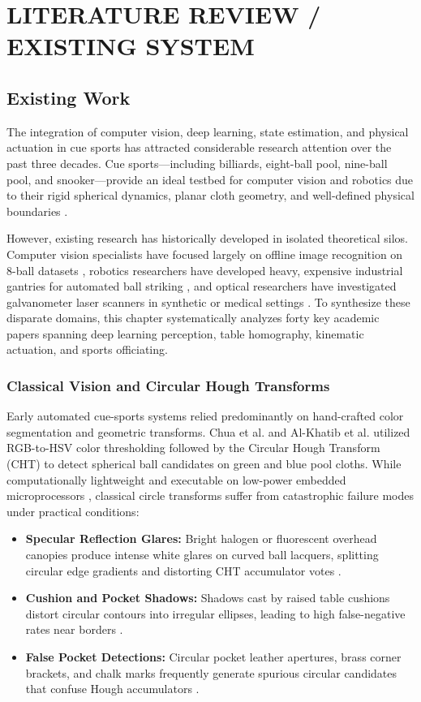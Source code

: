 \chapter{LITERATURE REVIEW / EXISTING SYSTEM}

\section{Existing Work}
The integration of computer vision, deep learning, state estimation, and physical actuation in cue sports has attracted considerable research attention over the past three decades. Cue sports---including billiards, eight-ball pool, nine-ball pool, and snooker---provide an ideal testbed for computer vision and robotics due to their rigid spherical dynamics, planar cloth geometry, and well-defined physical boundaries \cite{ref15, ref16, ref24}. 

However, existing research has historically developed in isolated theoretical silos. Computer vision specialists have focused largely on offline image recognition on 8-ball datasets \cite{ref1, ref2, ref3}, robotics researchers have developed heavy, expensive industrial gantries for automated ball striking \cite{ref15, ref16}, and optical researchers have investigated galvanometer laser scanners in synthetic or medical settings \cite{ref17, ref18}. To synthesize these disparate domains, this chapter systematically analyzes forty key academic papers spanning deep learning perception, table homography, kinematic actuation, and sports officiating.

\subsection{Classical Vision and Circular Hough Transforms}
Early automated cue-sports systems relied predominantly on hand-crafted color segmentation and geometric transforms. Chua et al. \cite{ref4} and Al-Khatib et al. \cite{ref5} utilized RGB-to-HSV color thresholding followed by the Circular Hough Transform (CHT) to detect spherical ball candidates on green and blue pool cloths. While computationally lightweight and executable on low-power embedded microprocessors \cite{ref28}, classical circle transforms suffer from catastrophic failure modes under practical conditions:
\begin{itemize}
    \item \textbf{Specular Reflection Glares:} Bright halogen or fluorescent overhead canopies produce intense white glares on curved ball lacquers, splitting circular edge gradients and distorting CHT accumulator votes \cite{ref2, ref10}.
    \item \textbf{Cushion and Pocket Shadows:} Shadows cast by raised table cushions distort circular contours into irregular ellipses, leading to high false-negative rates near borders \cite{ref7, ref8}.
    \item \textbf{False Pocket Detections:} Circular pocket leather apertures, brass corner brackets, and chalk marks frequently generate spurious circular candidates that confuse Hough accumulators \cite{ref13, ref28}.
\end{itemize}

